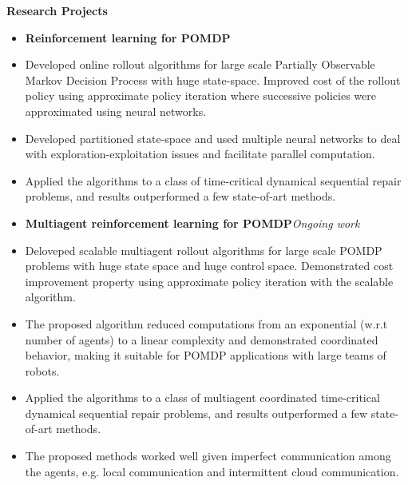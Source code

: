 \documentclass[a4paper,11pt]{article}
\newcommand{\resheading}[1]{{\small \colorbox{mygrey}{\begin{minipage}{0.975\textwidth}{\textbf{#1 \vphantom{p\^{E}}}}\end{minipage}}}}
\begin{document}
	\resheading{\textbf{\large Research Projects}}
	\begin{description}
		\item 
		\begin{itemize}
			\item\textbf{Reinforcement learning for POMDP}
			\item Developed online rollout algorithms for large scale Partially Observable Markov Decision Process with huge state-space. Improved cost of the rollout policy using approximate policy iteration where successive policies were approximated using neural networks.
			\item Developed partitioned state-space and used multiple neural networks to deal with exploration-exploitation issues and facilitate parallel computation.
			\item Applied the algorithms to a class of time-critical dynamical sequential repair problems, and results outperformed a few state-of-art methods.
			
		\end{itemize}
		\item 
		\begin{itemize}
			\item\textbf{Multiagent reinforcement learning for POMDP}\hfill \textit{Ongoing work}
			\item Deloveped scalable multiagent rollout algorithms for large scale POMDP problems with huge state space and huge control space. Demonstrated cost improvement property using approximate policy iteration with the scalable algorithm.
			\item The proposed algorithm reduced computations from an exponential (w.r.t number of agents) to a linear complexity and demonstrated coordinated behavior, making it suitable for POMDP applications with large teams of robots.
			\item Applied the algorithms to a class of multiagent coordinated time-critical dynamical sequential repair problems, and results outperformed a few state-of-art methods.
			\item The proposed methods worked well given imperfect communication among the agents, e.g. local communication and intermittent cloud communication.
			
			
		\end{itemize}
	\end{description}
	
\end{document}
